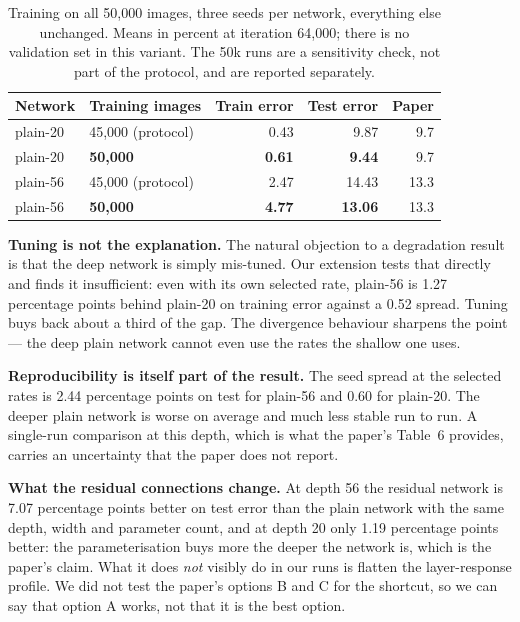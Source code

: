 \documentclass[11pt,a4paper]{article}
\newcommand{\pp}{percentage points}
\begin{document}
\begin{table}[htbp]
\centering
\begin{tabular}{@{}llrrr@{}}
\toprule
Network & Training images & Train error & Test error & Paper \\
\midrule
plain-20 & 45{,}000 (protocol) & 0.43 & 9.87 & 9.7 \\
plain-20 & \textbf{50{,}000} & \textbf{0.61} & \textbf{9.44} & 9.7 \\
plain-56 & 45{,}000 (protocol) & 2.47 & 14.43 & 13.3 \\
plain-56 & \textbf{50{,}000} & \textbf{4.77} & \textbf{13.06} & 13.3 \\
\bottomrule
\end{tabular}
\caption{Training on all 50{,}000 images, three seeds per network, everything
else unchanged. Means in percent at iteration 64{,}000; there is no validation
set in this variant. The 50k runs are a sensitivity check, not part of the
protocol, and are reported separately.}\label{tab:fiftyk}
\end{table}

\textbf{Tuning is not the explanation.} The natural objection to a degradation
result is that the deep network is simply mis-tuned. Our extension tests that
directly and finds it insufficient: even with its own selected rate, plain-56
is 1.27 \pp{} behind plain-20 on training error against a 0.52 spread. Tuning
buys back about a third of the gap. The divergence behaviour sharpens the point
--- the deep plain network cannot even use the rates the shallow one uses.

\textbf{Reproducibility is itself part of the result.} The seed spread at the
selected rates is 2.44 \pp{} on test for plain-56 and 0.60 for plain-20. The
deeper plain network is worse on average and much less stable run to run. A
single-run comparison at this depth, which is what the paper's Table~6 provides,
carries an uncertainty that the paper does not report.

\textbf{What the residual connections change.} At depth 56 the residual network
is 7.07 \pp{} better on test error than the plain network with the same depth,
width and parameter count, and at depth 20 only 1.19 \pp{} better: the
parameterisation buys more the deeper the network is, which is the paper's
claim. What it does \emph{not} visibly do in our runs is flatten the
layer-response profile. We did not test the paper's options B and C for the
shortcut, so we can say that option A works, not that it is the best option.
\end{document}
